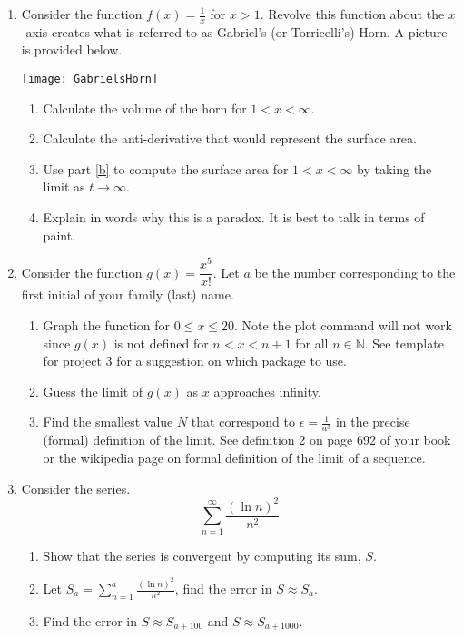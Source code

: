 \documentclass[11pt]{article}
\begin{document}
\begin{enumerate}
\item
Consider the function $f(x)=\frac1x$ for $x>1$.  Revolve this function about the $x$-axis creates what is referred to as Gabriel's (or Torricelli's) Horn.  A picture is provided below.

\begin{center}
\texttt{[image: GabrielsHorn]}
\end{center}
\begin{enumerate}
\item Calculate the volume of the horn for $1<x<\infty$.
\item Calculate the anti-derivative that would represent the surface area.\label{b}
\item Use part \ref{b} to compute the surface area for $1<x<\infty$ by taking the limit as $t\to\infty$.
\item Explain in words why this is a paradox.  It is best to talk in terms of paint.
\end{enumerate}
\item Consider the function $g(x)=\dfrac {x^5}{x!}$.  Let $a$ be the number corresponding to the first initial of your family (last) name.
\begin{enumerate}
\item Graph the function for $0\leq x\leq20$.  Note the plot command will not work since $g(x)$ is not defined for $n<x<n+1$ for all $n\in\mathbb{N}$.  See template for project 3 for a suggestion on which package to use.
\item Guess the limit of $g(x)$ as $x$ approaches infinity.
\item Find the smallest value $N$ that correspond to $\epsilon=\frac 1{a^3}$ in the precise (formal) definition of the limit.  See definition 2 on page 692 of your book or the wikipedia page on formal definition of the limit of a sequence.
\end{enumerate}
\item Consider the series.
\[
\sum_{n=1}^\infty\frac{\left(\ln n\right)^2}{n^2}
\]
\begin{enumerate}
\item Show that the series is convergent by computing its sum,  $S$.
\item Let $\displaystyle S_a=\sum_{n=1}^a\frac{\left(\ln n\right)^2}{n^2}$, find the error in $S\approx S_a$.
\item Find the error in $S\approx S_{a+100}$ and $S\approx S_{a+1000}$.

\end{enumerate}
\end{enumerate}
\end{document}
